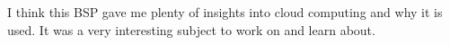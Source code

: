 
I think this BSP gave me plenty of insights into cloud computing and
why it is used. It was a very interesting subject to work on and learn
about.

